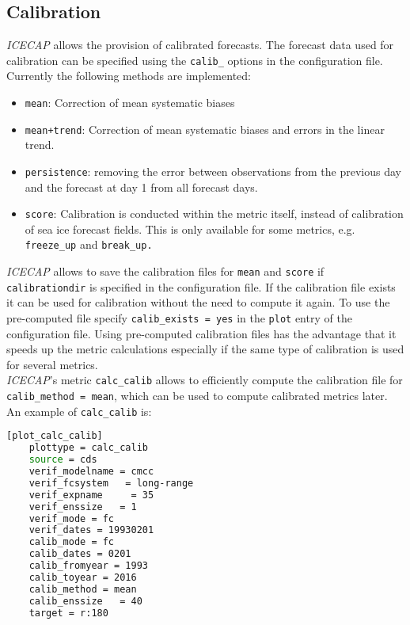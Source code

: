\documentclass[DIV=10, parskip=full]{scrreprt}
\newcommand{\ice}{\textit{ICECAP}\xspace}
\begin{document}
\subsection{Calibration}
\label{subsec:calibration}
\ice allows the provision of calibrated forecasts. The forecast data used for calibration can be specified using the \texttt{calib\_} options in the configuration file. \\
Currently the following methods are implemented:
\begin{itemize}
	\item \texttt{mean}: Correction of mean systematic biases 
	\item \texttt{mean+trend}: Correction of mean systematic biases and errors in the linear trend.
	\item \texttt{persistence}: removing the error between observations from the previous day and the forecast at day 1 from all forecast days. 
	\item \texttt{score}: Calibration is conducted within the metric itself, instead of calibration of sea ice forecast fields. This is only available for some metrics, e.g. \texttt{freeze\_up} and \texttt{break\_up.}
\end{itemize}

\ice allows to save the calibration files for \texttt{mean} and \texttt{score} if \texttt{calibrationdir} is specified in the configuration file. If the calibration file exists it can be used for calibration without the need to compute it again. To use the pre-computed file specify \texttt{calib\_exists = yes} in the \texttt{plot} entry of the configuration file. Using pre-computed calibration files has the advantage that it speeds up the metric calculations especially if the same type of calibration is used for several metrics. \\


\ice's metric \texttt{calc\_calib} allows to efficiently compute the calibration file for \texttt{calib\_method = mean}, which can be used to compute calibrated metrics later. An example of \texttt{calc\_calib} is:

\begin{lstlisting}[language=bash]
	[plot_calc_calib]
	plottype = calc_calib
	source = cds
	verif_modelname = cmcc
	verif_fcsystem   = long-range
	verif_expname     = 35
	verif_enssize   = 1
	verif_mode = fc
	verif_dates = 19930201
	calib_mode = fc
	calib_dates = 0201
	calib_fromyear = 1993
	calib_toyear = 2016
	calib_method = mean
	calib_enssize   = 40
	target = r:180
\end{lstlisting}
\end{document}
